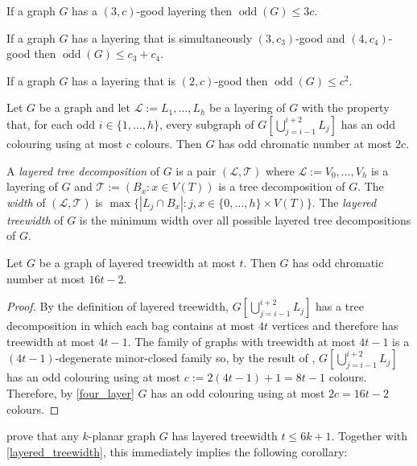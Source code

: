 \documentclass{patmorin}
\DeclareMathOperator{\odd}{odd}
\begin{document}
\begin{lem}
  If a graph $G$ has a $(3,c)$-good layering then $\odd(G)\le 3c$.
\end{lem}

\begin{lem}
  If a graph $G$ has a layering that is simultaneously $(3,c_3)$-good and $(4,c_4)$-good then $\odd(G)\le c_3+c_4$.
\end{lem}


\begin{lem}
  If a graph $G$ has a layering that is $(2,c)$-good then $\odd(G)\le c^2$.
\end{lem}




\begin{lem}\label{four_layer}
  Let $G$ be a graph and let $\mathcal{L}:=L_1,\ldots,L_h$ be a layering of $G$ with the property that, for each odd $i\in\{1,\ldots,h\}$, every subgraph of $G[\bigcup_{j=i-1}^{i+2}L_{j}]$ has an odd colouring using at most $c$ colours. Then $G$ has odd chromatic number at most $2c$.
\end{lem}

A \emph{layered tree decomposition} of $G$ is a pair $(\mathcal{L},\mathcal{T})$ where $\mathcal{L}:=V_0,\ldots,V_h$ is a layering of $G$ and $\mathcal{T}:=(B_x:x\in V(T))$ is a tree decomposition of $G$.  The \emph{width} of $(\mathcal{L},\mathcal{T})$ is $\max\{|L_j\cap B_x|:j,x\in\{0,\ldots,h\}\times V(T)\}$.  The \emph{layered treewidth} of $G$ is the minimum width over all possible layered tree decompositions of $G$.


\begin{cor}\label{layered_treewidth}
  Let $G$ be a graph of layered treewidth at most $t$.  Then $G$ has odd chromatic number at most $16t-2$.
\end{cor}

\begin{proof}
  By the definition of layered treewidth, $G[\bigcup_{j=i-1}^{i+2}L_{j}]$ has a tree decomposition in which each bag contains at most $4t$ vertices and therefore has treewidth at most $4t-1$.  The family of graphs with treewidth at most $4t-1$ is a $(4t-1)$-degenerate minor-closed family so, by the result of \citet{cranston.XX}, $G[\bigcup_{j=i-1}^{i+2}L_{j}]$ has an odd colouring using at most $c:=2(4t-1)+1=8t-1$ colours.  Therefore, by \cref{four_layer} $G$ has an odd colouring using at most $2c=16t-2$ colours.
\end{proof}

\citet{dujmovic.eppstein.ea:genus} prove that any $k$-planar graph $G$ has layered treewidth $t\le 6k+1$.  Together with \cref{layered_treewidth}, this immediately implies the following corollary:
\end{document}
